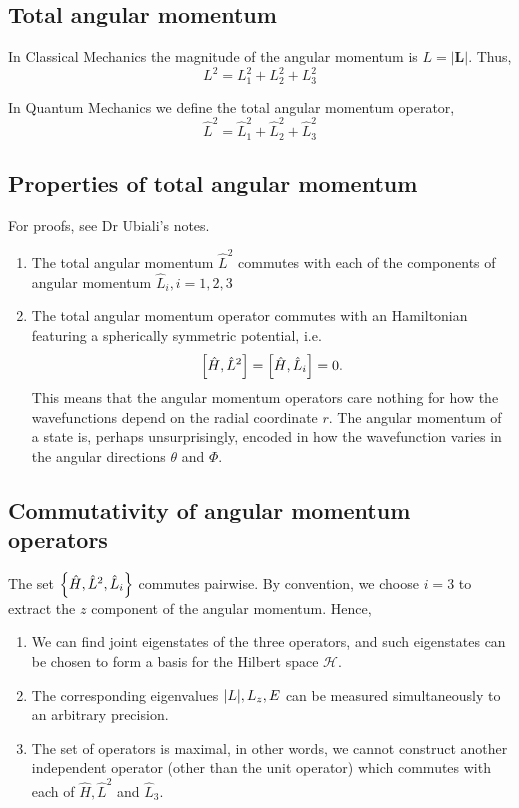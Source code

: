 \documentclass[a4paper]{article}
\begin{document}
\subsection{Total angular momentum}

In Classical Mechanics the magnitude of the angular momentum is $L=|\mathbf{L}|$. Thus,
\[
L^2=L_1^2+L_2^2+L_3^2
\]
\begin{definition}
	In Quantum Mechanics we define the total angular momentum operator,
	\[
	\hat{L}^2=\hat{L}_1^2+\hat{L}_2^2+\hat{L}_3^2
	\]
\end{definition}

\subsection{Properties of total angular momentum}
For proofs, see Dr Ubiali's notes. 
\begin{enumerate}
	\item The total angular momentum $\hat{L}^2$ commutes with each of the components of angular momentum $\hat{L}_i, i=1,2,3$
	\item The total angular momentum operator commutes with an Hamiltonian featuring a spherically symmetric potential, i.e. 
	\[
		\qty[\hat H, \hat L^2] = \qty[\hat H, \hat L_i] = 0. 
	\]
	This means that the angular momentum operators care nothing for how the wavefunctions depend on the radial coordinate $r$. The angular momentum of a state is, perhaps unsurprisingly, encoded in how the wavefunction varies in the angular directions $\theta$ and $\Phi$.
\end{enumerate}

\subsection{Commutativity of angular momentum operators}
The set \( \qty{ \hat H, \hat L^2, \hat L_i } \) commutes pairwise.
By convention, we choose \( i = 3 \) to extract the \( z \) component of the angular momentum.
Hence,
\begin{enumerate}
	\item We can find joint eigenstates of the three operators, and such eigenstates can be chosen to form a basis for the Hilbert space \( \mathcal H \).
	\item The corresponding eigenvalues \( \abs{L}, L_z, E \) can be measured simultaneously to an arbitrary precision.
	\item The set of operators is maximal, in other words, we cannot construct another independent operator (other than the unit operator) which commutes with each of $\hat{H}, \hat{L}^2$ and $\hat{L}_3$.
\end{enumerate}
\end{document}
